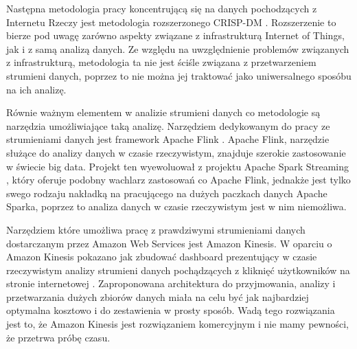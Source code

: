 Następna metodologia pracy koncentrującą się na danych pochodzących z Internetu Rzeczy jest metodologia rozszerzonego CRISP-DM \cite{Bernard+Jaokar}. Rozszerzenie to bierze pod uwagę zarówno aspekty związane z infrastrukturą Internet of Things, jak i z samą analizą danych. Ze względu na uwzględnienie problemów związanych z infrastrukturą, metodologia ta nie jest ściśle związana z przetwarzeniem strumieni danych, poprzez to nie można jej traktować jako uniwersalnego sposóbu na ich analizę.

Równie ważnym elementem w analizie strumieni danych co metodologie są narzędzia umożliwiające taką analizę. Narzędziem dedykowanym do pracy ze strumieniami danych jest framework Apache Flink \cite{Flink}. Apache Flink, narzędzie służące do analizy danych w czasie rzeczywistym, znajduje szerokie zastosowanie w świecie big data. Projekt ten wyewoluował z projektu Apache Spark Streaming \cite{SparkStreaming}, który oferuje podobny wachlarz zastosowań co Apache Flink, jednakże jest tylko swego rodzaju nakładką na pracującego na dużych paczkach danych Apache Sparka, poprzez to analiza danych w czasie rzeczywistym jest w nim niemożliwa.

Narzędziem które umożliwa pracę z prawdziwymi strumieniami danych dostarczanym przez Amazon Web Services jest Amazon Kinesis. W oparciu o Amazon Kinesis pokazano jak zbudować dashboard prezentujący w czasie rzeczywistym analizy strumieni danych pochądzących z kliknięć użytkowników na stronie internetowej \cite{Kinesis}. Zaproponowana architektura do przyjmowania, analizy i przetwarzania dużych zbiorów danych miała na celu być jak najbardziej optymalna kosztowo i do zestawienia w prosty sposób. Wadą tego rozwiązania jest to, że Amazon Kinesis jest rozwiązaniem komercyjnym i nie mamy pewności, że przetrwa próbę czasu.